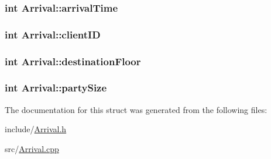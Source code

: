 \subsubsection[{arrival\+Time}]{\setlength{\rightskip}{0pt plus 5cm}int Arrival\+::arrival\+Time}\label{struct_arrival_a1604fbb65bfcc4c08cb2a4e31533dd15}
\hypertarget{struct_arrival_ad125f5bf352f24c0f02fbd25833fcbe9}{}
\subsubsection[{client\+I\+D}]{\setlength{\rightskip}{0pt plus 5cm}int Arrival\+::client\+I\+D}\label{struct_arrival_ad125f5bf352f24c0f02fbd25833fcbe9}
\hypertarget{struct_arrival_ae3cbceb243227c0e74011dcb04176e2f}{}
\subsubsection[{destination\+Floor}]{\setlength{\rightskip}{0pt plus 5cm}int Arrival\+::destination\+Floor}\label{struct_arrival_ae3cbceb243227c0e74011dcb04176e2f}
\hypertarget{struct_arrival_a13cb78aefa91f18325ff068a2bd4ca93}{}
\subsubsection[{party\+Size}]{\setlength{\rightskip}{0pt plus 5cm}int Arrival\+::party\+Size}\label{struct_arrival_a13cb78aefa91f18325ff068a2bd4ca93}


The documentation for this struct was generated from the following files\+:\begin{DoxyCompactItemize}
\item 
include/\hyperlink{_arrival_8h}{Arrival.\+h}\item 
src/\hyperlink{_arrival_8cpp}{Arrival.\+cpp}\end{DoxyCompactItemize}
